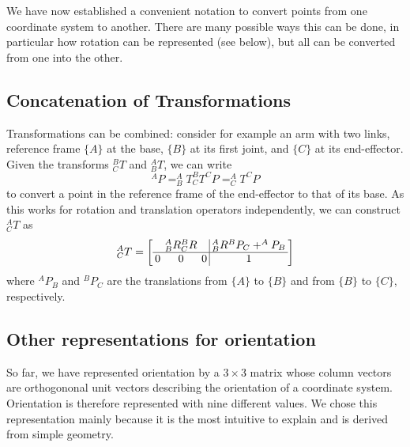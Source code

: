 We have now established a convenient notation to convert points from one coordinate system to another. There are many possible ways this can be done, in particular how rotation can be represented (see below), but all can be converted from one into the other.

\subsection{Concatenation of Transformations}\label{sec:kinematics:coordsystems:concatenation}

Transformations can be combined: consider for example an arm with two links, reference frame $\{A\}$ at the base, $ \{B\} $ at its first joint, and $\{C\}$ at its end-effector. Given the transforms $ ^B_CT$ and $ ^A_BT$, we can write
\begin{equation}
^AP=^A_BT^B_CT^CP=^A_CT^CP
\end{equation}
to convert a point in the reference frame of the end-effector to that of its base. As this works for rotation and translation operators independently, we can construct $ ^A_CT$ as
\begin{equation}
^A_CT=\left[\arraycolsep=2pt\begin{array}{ccc|c} & ^A_BR^B_CR & & ^A_BR^BP_C +^AP_B \\\hline 0 & 0 & 0 & 1\end{array}\right]
\end{equation}
%
where $ ^AP_B$ and $ ^BP_C$ are the translations from $\{A\}$ to $\{B\}$ and from $ \{B\}$ to $\{C\}$, respectively.

\subsection{Other representations for orientation}

So far, we have represented orientation by a $3\times3$ matrix whose column vectors are orthogononal unit vectors describing the orientation of a coordinate system. Orientation is therefore represented with nine different values. We chose this representation mainly because it is the most intuitive to explain and is derived from simple geometry.

